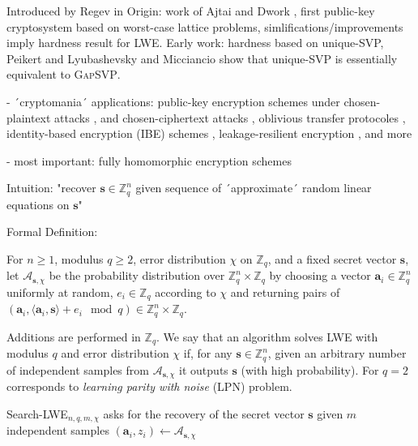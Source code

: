 \documentclass[
  a4paper,  %
  twoside,  %
  bibliography=totoc,
  headsepline,
  cleardoublepage=empty,
  parskip=half,
  draft=false
]{scrbook}
\begin{document}
Introduced by Regev in \cite{Reg09}
Origin: work of Ajtai and Dwork \cite{AD97}, first public-key cryptosystem based on worst-case lattice problems, simlifications/improvements \cite{GGH97b, Reg03} imply hardness result for LWE. 
Early work: hardness based on unique-SVP, Peikert \cite{Pei09} and Lyubashevsky and Micciancio \cite{LM09} show that unique-SVP is essentially equivalent to \textsc{GapSVP}.

- ´cryptomania´ applications: public-key encryption schemes under chosen-plaintext attacks \cite{Reg05, KTX07, PVW08}, and chosen-ciphertext attacks \cite{PW08, Pei09}, oblivious transfer protocoles \cite{PVW08}, identity-based encryption (IBE) schemes \cite{GPV08, CHKP10, ABB10}, leakage-resilient encryption \cite{AGV09, ACPS09, DGKPV10, GKPV10}, and more %

- most important: fully homomorphic encryption schemes \cite{Gen09a, BV11, Bra12, GSW13} %

Intuition: "recover $\textbf{s} \in \mathbb{Z}_q^n$ given sequence of ´approximate´ random linear equations on $\textbf{s}$" 

Formal Definition: 
\begin{definition} %
  For $n \geq 1$, modulus $q \geq 2$, error distribution $\chi$ on $\mathbb{Z}_q$, and a fixed secret vector $\textbf{s}$, let $\mathcal{A}_{\textbf{s}, \chi}$ be the probability distribution over $\mathbb{Z}_q^n \times \mathbb{Z}_q$ by choosing a vector $\textbf{a}_i \in \mathbb{Z}_q^n$ uniformly at random, $e_i \in \mathbb{Z}_q$ according to $\chi$ and returning pairs of $(\textbf{a}_i, \langle \textbf{a}_i, \textbf{s} \rangle + e_i \mod q) \in \mathbb{Z}_q^n \times \mathbb{Z}_q$.
\end{definition}

Additions are performed in $\mathbb{Z}_q$. We say that an algorithm solves LWE with modulus $q$ and error distribution $\chi$ if, for any $\textbf{s} \in \mathbb{Z}_q^n$, given an arbitrary number of independent samples from $\mathcal{A}_{\textbf{s}, \chi}$ it outputs $\textbf{s}$ (with high probability). For $q=2$ corresponds to \textit{learning parity with noise} (LPN) problem. %

\begin{definition} %
  Search-LWE$_{n, q, m, \chi}$ asks for the recovery of the secret vector $\textbf{s}$ given $m$ independent samples $(\textbf{a}_i, z_i) \leftarrow \mathcal{A}_{\textbf{s}, \chi}$ %
\end{definition}
\end{document}
